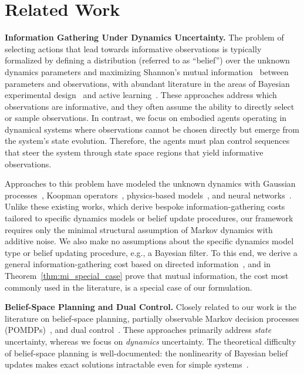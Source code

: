 \section{Related Work}
\label{sec:related}

\textbf{Information Gathering Under Dynamics Uncertainty.}
The problem of selecting actions that lead towards informative observations is typically formalized by defining a distribution (referred to as ``belief'') over the unknown dynamics parameters and maximizing Shannon's mutual information~\cite{shannon1948mathematical,cover1999elements} between parameters and observations, with abundant literature in the areas of Bayesian experimental design~\cite{rainforth2024modern} and active learning~\cite{settles2009active,cohn1994improving,zhan2022comparative}.
These approaches address which observations are informative, and they often assume the ability to directly select or sample observations. 
In contrast, we focus on embodied agents operating in dynamical systems where observations cannot be chosen directly but emerge from the system's state evolution. Therefore, the agents must plan control sequences that steer the system through state space regions that yield informative observations.

Approaches to this problem have modeled the unknown dynamics with Gaussian processes~\cite{sukhija2023optimistic, buisson2020actively, krause2007nonmyopic, krause2008near, zimmer2018safe}, Koopman operators~\cite{abraham2019active}, physics-based models~\cite{vantilborgh2025dual}, and neural networks~\cite{davydov2024first, lew2022safe, palafox2025info}.
Unlike these existing works, which derive bespoke information-gathering costs tailored to specific dynamics models or belief update procedures, our framework requires only the minimal structural assumption of Markov dynamics with additive noise.
We also make no assumptions about the specific dynamics model type or belief updating procedure, e.g., a Bayesian filter.
To this end, we derive a general information-gathering cost based on directed information~\cite{massey1990causality}, and in Theorem~\ref{thm:mi_special_case} prove that mutual information, the cost most commonly used in the literature, is a special case of our formulation.

\textbf{Belief-Space Planning and Dual Control.}
Closely related to our work is the literature on belief-space planning, partially observable Markov decision processes (POMDPs)~\cite{kaelbling1998planning, platt2010belief, van2012motion, van2016motion, patil2015scaling}, and dual control~\cite{feldbaum1960dual,mesbah2018stochastic}.
These approaches primarily address \emph{state} uncertainty, whereas we focus on \emph{dynamics} uncertainty.
The theoretical difficulty of belief-space planning is well-documented: the nonlinearity of Bayesian belief updates makes exact solutions intractable even for simple systems~\cite{klenske2016dual, bar1974dual, wittenmark1995adaptive}.

